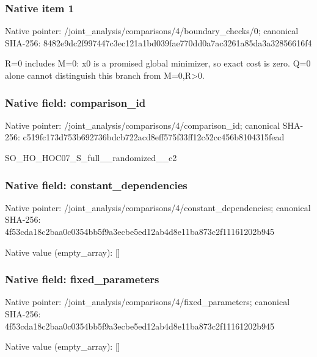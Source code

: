 \documentclass[10pt,a4paper]{article}
\begin{document}
\subsubsection{Native item 1}
Native pointer: /joint\_\allowbreak{}analysis/comparisons/4/boundary\_\allowbreak{}checks/0; canonical SHA-256: 8482e9dc2f997447c3ec121a1bd039fae770dd0a7ac3261a85da3a32856616f4

\begingroup\raggedright\sloppy R=\allowbreak{}0 includes M=\allowbreak{}0:\allowbreak{} x0 is a promised global minimizer,\allowbreak{} so exact cost is zero. Q=\allowbreak{}0 alone cannot distinguish this branch from M=\allowbreak{}0,\allowbreak{}R>0.\par\endgroup

\subsubsection{Native field: comparison\_\allowbreak{}id}
Native pointer: /joint\_\allowbreak{}analysis/comparisons/4/comparison\_\allowbreak{}id; canonical SHA-256: c519fc173d753b692736bdcb722acd8eff575f33ff12c52cc456b8104315fead

\begingroup\raggedright\sloppy SO\_\allowbreak{}HO\_\allowbreak{}HOC07\_\allowbreak{}S\_\allowbreak{}full\_\allowbreak{}\_\allowbreak{}randomized\_\allowbreak{}\_\allowbreak{}c2\par\endgroup

\subsubsection{Native field: constant\_\allowbreak{}dependencies}
Native pointer: /joint\_\allowbreak{}analysis/comparisons/4/constant\_\allowbreak{}dependencies; canonical SHA-256: 4f53cda18c2baa0c0354bb5f9a3ecbe5ed12ab4d8e11ba873c2f11161202b945

Native value (empty\_\allowbreak{}array): []

\subsubsection{Native field: fixed\_\allowbreak{}parameters}
Native pointer: /joint\_\allowbreak{}analysis/comparisons/4/fixed\_\allowbreak{}parameters; canonical SHA-256: 4f53cda18c2baa0c0354bb5f9a3ecbe5ed12ab4d8e11ba873c2f11161202b945

Native value (empty\_\allowbreak{}array): []
\end{document}
